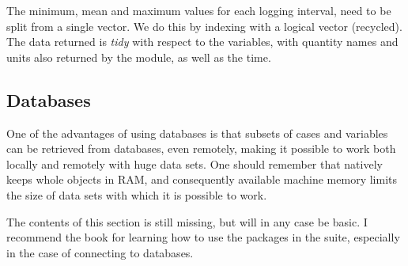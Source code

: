 \documentclass[krantz2]{krantz}\usepackage{knitr}%
\begin{document}
The minimum, mean and maximum values for each logging interval, need to be split from a single vector. We do this by indexing with a logical vector (recycled). The data returned is \emph{tidy} with respect to the variables, with quantity names and units also returned by the module, as well as the time.

\begin{knitrout}\footnotesize
{}\color{fgcolor}\begin{kframe}
\begin{alltt}
     \hlkwb{<-} \hlstd{(Meteo01.lst[[}\hlstd{]])}
    \hlopt{::}
                      \hlstd{=}   \hlstd{=} \hlstd{,}  \hlstd{=} \hlstd{),}
                      
                      
                      \hlstd{= val.vector[}\hlstd{(}\hlstd{,} \hlstd{,} \hlstd{)],}
                      \hlstd{= val.vector[}\hlstd{(}\hlstd{,} \hlstd{,} \hlstd{)],}
                      \hlstd{= val.vector[}\hlstd{(}\hlstd{,} \hlstd{,} \hlstd{)],}
\end{alltt}
\end{kframe}
\end{knitrout}

\subsection{Databases}\label{sec:data:db}

One of the advantages of using databases is that subsets of cases and variables can be retrieved from databases, even remotely, making it possible to work both locally and remotely with huge data sets. One should remember that \Rlang natively keeps whole objects in RAM, and consequently available machine memory limits the size of data sets with which it is possible to work.

\begin{infobox}
The contents of this section is still missing, but will in any case be basic. I recommend the book  \autocite{Wickham2017} for learning how to use the packages in the  suite, especially in the case of connecting to databases.
\end{infobox}
\end{document}
